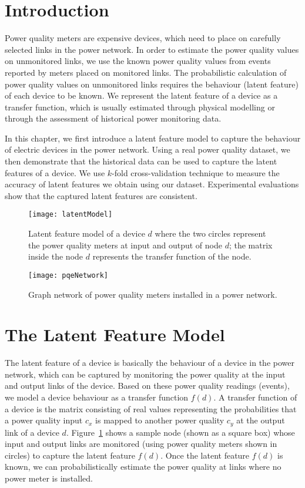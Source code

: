 \label{chap:latentF}
\section{Introduction}
Power quality meters are expensive devices, which need to place on carefully selected links in the power network. In order to estimate the power quality values on unmonitored links, we use the known power quality values from events reported by meters placed on monitored links. The probabilistic calculation of power quality values on unmonitored links requires the behaviour (latent feature) of each device to be known. We represent the latent feature of a device as a transfer function, which is usually estimated through physical modelling or through the assessment of historical power monitoring data.

In this chapter, we first introduce a latent feature model to capture the behaviour of electric devices in the power network. Using a real power quality dataset, we then demonstrate that the historical data can be used to capture the latent features of a device. We use $k$-fold cross-validation technique to measure the accuracy of latent features we obtain using our dataset. Experimental evaluations show that the captured latent features are consistent.

\begin{figure}[!t]
\center
\texttt{[image: latentModel]}
\caption{Latent feature model of a device $d$ where the two circles represent the power quality meters at input and output of node $d$; the matrix inside the node $d$ represents the transfer function of the node.}
\label{fig:latentModel}

\end{figure}

\begin{figure}[!t]
\center
\texttt{[image: pqeNetwork]}
\caption{Graph network of power quality meters installed in a power network.}
\label{fig:pqeNetwork}
\end{figure}

\section{The Latent Feature Model}
The latent feature of a device is basically the behaviour of a device in the power network, which can be captured by monitoring the power quality at the input and output links of the device. Based on these power quality readings (events), we model a device behaviour as a transfer function $f{(d)}$. A transfer function of a device is the matrix consisting of real values representing the probabilities that a power quality input $c_x$ is mapped to another power quality $c_y$ at the output link of a device $d$. Figure~\ref{fig:latentModel} shows a sample node (shown as a square box) whose input and output links are monitored (using power quality meters shown in circles) to capture the latent feature $f(d)$. Once the latent feature $f(d)$ is known, we can probabilistically estimate the power quality at links where no power meter is installed.

